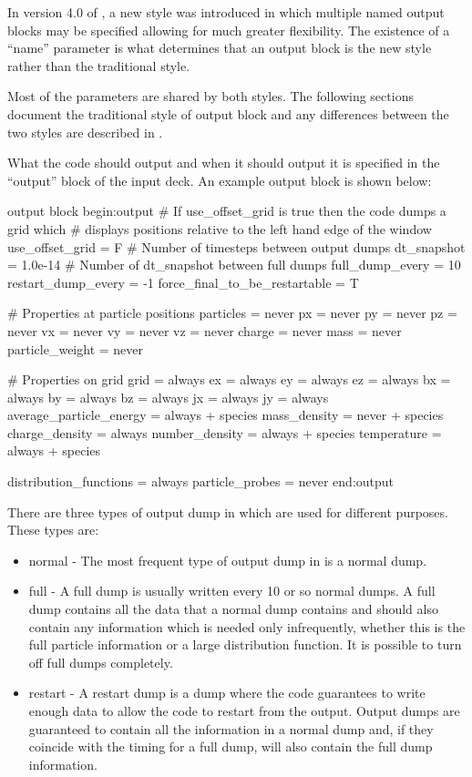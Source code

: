 In version 4.0 of {\EPOCH}, a new style was introduced in which multiple
named output blocks may be specified allowing for much greater flexibility.
The existence of a ``name'' parameter is what determines that an output block
is the new style rather than the traditional style.

Most of the parameters are shared by both styles. The following sections
document the traditional style of output block and any differences between
the two styles are described in .

What the code should output and when it should output it is
specified in the ``output'' block of the input deck.
An example output block is shown below:
\begin{lboxverbatim}{output block}
begin:output
   # If use_offset_grid is true then the code dumps a grid which
   # displays positions relative to the left hand edge of the window
   use_offset_grid = F
   # Number of timesteps between output dumps
   dt_snapshot = 1.0e-14
   # Number of dt_snapshot between full dumps
   full_dump_every = 10
   restart_dump_every = -1
   force_final_to_be_restartable = T

   # Properties at particle positions
   particles = never
   px = never
   py = never
   pz = never
   vx = never
   vy = never
   vz = never
   charge = never
   mass = never
   particle_weight = never

   # Properties on grid
   grid = always
   ex = always
   ey = always
   ez = always
   bx = always
   by = always
   bz = always
   jx = always
   jy = always
   average_particle_energy = always + species
   mass_density = never + species
   charge_density = always
   number_density = always + species
   temperature = always + species

   distribution_functions = always
   particle_probes = never
end:output
\end{lboxverbatim}

There are three types of output dump in {\EPOCH} which are used for different
purposes. These types are:

\begin{itemize}
\item normal - The most frequent type of output dump in {\EPOCH} is a
  normal dump.
\item full - A full dump is usually written every 10 or so normal dumps. A
  full dump contains all the data that a normal dump contains and should also
  contain any information which is needed only infrequently, whether this is
  the full particle information or a large distribution function. It is
  possible to turn off full dumps completely.
\item restart - A restart dump is a dump where the code guarantees to
  write enough data to allow the code to restart from the output. Output dumps
  are guaranteed to contain all the information in a normal dump and, if they
  coincide with the timing for a full dump, will also contain the full dump
  information.
\end{itemize}

